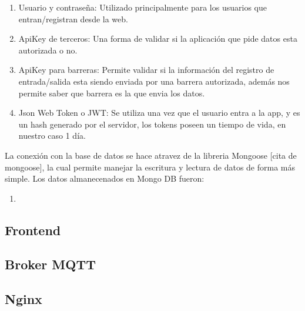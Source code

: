 \begin{enumerate}
    \item Usuario y contraseña: Utilizado principalmente para los usuarios que entran/registran desde la web.
    \item ApiKey de terceros: Una forma de validar si la aplicación que pide datos esta autorizada o no.
    \item ApiKey para barreras: Permite validar si la información del registro de entrada/salida esta siendo enviada por una barrera autorizada, además nos permite saber que barrera es la que envia los datos.
    \item Json Web Token o JWT: Se utiliza una vez que el usuario entra a la app, y es un hash generado por el servidor, los tokens poseen un tiempo de vida, en nuestro caso 1 día.
\end{enumerate}

La conexión con la base de datos se hace atravez de la libreria Mongoose [cita de mongoose], la cual permite manejar la escritura y lectura de datos de forma más simple. Los datos almanecenados en Mongo DB fueron:

\begin{enumerate}
    \item
\end{enumerate}

\subsection{Frontend}

\subsection{Broker MQTT}



\subsection{Nginx}
